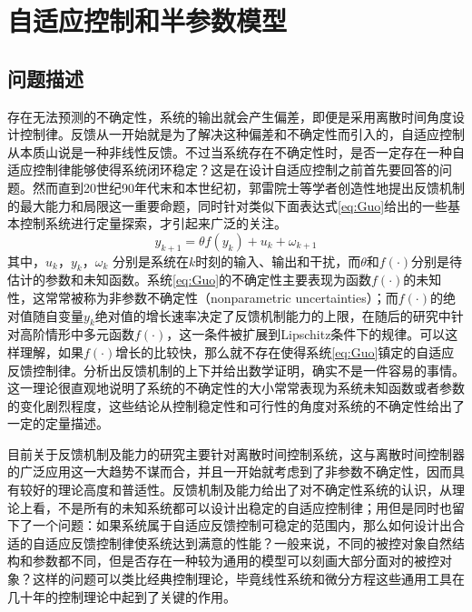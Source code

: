 \chapter{自适应控制和半参数模型}
\label{chap:2 }
\section{问题描述}
存在无法预测的不确定性，系统的输出就会产生偏差，即便是采用离散时间角度设计控制律。反馈从一开始就是为了解决这种偏差和不确定性而引入的，自适应控制从本质山说是一种非线性反馈。不过当系统存在不确定性时，是否一定存在一种自适应控制律能够使得系统闭环稳定？这是在设计自适应控制之前首先要回答的问题。然而直到20世纪90年代末和本世纪初，郭雷院士等学者创造性地提出反馈机制的最大能力和局限这一重要命题，同时针对类似下面表达式\eqref{eq:Guo}给出的一些基本控制系统进行定量探索，才引起来广泛的关注。
\begin{equation}%
\label{eq:Guo}
y_{k+1} = \theta f(y_{k}) + u_{k} + \omega_{k+1}
\end{equation}
其中，$u_{k}$，$y_{k}$，$\omega_{k}$ 分别是系统在$k$时刻的输入、输出和干扰，而$\theta$和$f(\cdot)$分别是待估计的参数和未知函数。系统\eqref{eq:Guo}的不确定性主要表现为函数$f(\cdot)$的未知性，这常常被称为非参数不确定性（nonparametric uncertainties）；而$f(\cdot)$的绝对值随自变量$y_{k}$绝对值的增长速率决定了反馈机制能力的上限，在随后的研究中针对高阶情形中多元函数$f(\cdot)$，这一条件被扩展到Lipschitz条件下的规律。可以这样理解，如果$f(\cdot)$增长的比较快，那么就不存在使得系统\eqref{eq:Guo}镇定的自适应反馈控制律。分析出反馈机制的上下并给出数学证明，确实不是一件容易的事情。这一理论很直观地说明了系统的不确定性的大小常常表现为系统未知函数或者参数的变化剧烈程度，这些结论从控制稳定性和可行性的角度对系统的不确定性给出了一定的定量描述。

目前关于反馈机制及能力的研究主要针对离散时间控制系统，这与离散时间控制器的广泛应用这一大趋势不谋而合，并且一开始就考虑到了非参数不确定性，因而具有较好的理论高度和普适性。反馈机制及能力给出了对不确定性系统的认识，从理论上看，不是所有的未知系统都可以设计出稳定的自适应控制律；用但是同时也留下了一个问题：如果系统属于自适应反馈控制可稳定的范围内，那么如何设计出合适的自适应反馈控制律使系统达到满意的性能？一般来说，不同的被控对象自然结构和参数都不同，但是否存在一种较为通用的模型可以刻画大部分面对的被控对象？这样的问题可以类比经典控制理论，毕竟线性系统和微分方程这些通用工具在几十年的控制理论中起到了关键的作用。

